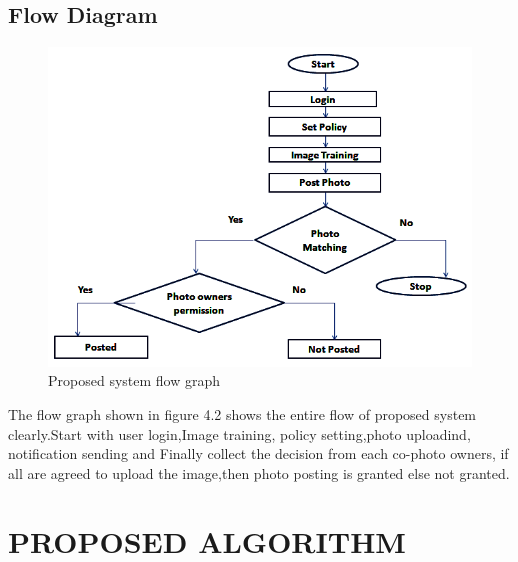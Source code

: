 \subsection[Flow Diagram]{Flow Diagram}
\vspace{2cm}
\begin{figure}[H]
\begin{minipage}[c]{1\linewidth}
\begin{center}
\includegraphics[width=\textwidth]{flowgraph.png}
           \caption[Proposed System Flow Graph]{ Proposed system flow graph}
             \label{Posted }
\end{center}
  \end{minipage}            
\end{figure}
The flow graph shown in figure 4.2 shows  the entire flow of proposed system clearly.Start with user login,Image training, policy setting,photo uploadind, notification sending and Finally collect the decision from each co-photo owners, if all are agreed to upload the  image,then  photo posting is granted else not granted.
\clearpage
\section[Proposed Algorithm]{\fontsize{14}{12}\selectfont PROPOSED ALGORITHM}
